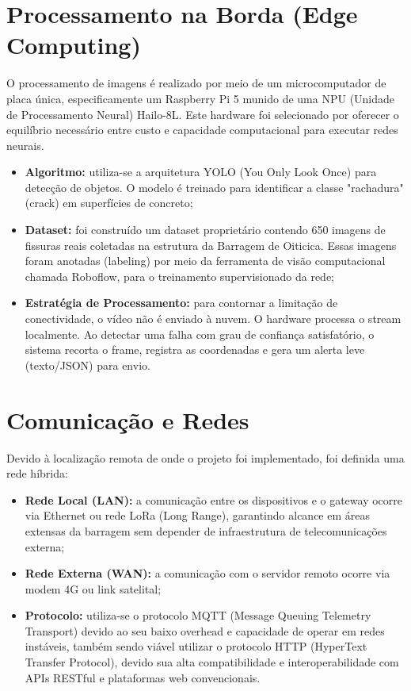 \section{Processamento na Borda (Edge Computing)}
O processamento de imagens é realizado por meio de um microcomputador de placa única, especificamente um Raspberry Pi 5 munido de uma NPU (Unidade de Processamento Neural) Hailo-8L. Este hardware foi selecionado por oferecer o equilíbrio necessário entre custo e capacidade computacional para executar redes neurais.
\begin{itemize}
    \item \textbf{Algoritmo:} utiliza-se a arquitetura YOLO (You Only Look Once) para detecção de objetos. O modelo é treinado para identificar a classe "rachadura" (crack) em superfícies de concreto;
    \item \textbf{Dataset:} foi construído um dataset proprietário contendo 650 imagens de fissuras reais coletadas na estrutura da Barragem de Oiticica. Essas imagens foram anotadas (labeling) por meio da ferramenta de visão computacional chamada Roboflow, para o treinamento supervisionado da rede;
    \item \textbf{Estratégia de Processamento:} para contornar a limitação de conectividade, o vídeo não é enviado à nuvem. O hardware processa o stream localmente. Ao detectar uma falha com grau de confiança satisfatório, o sistema recorta o frame, registra as coordenadas e gera um alerta leve (texto/JSON) para envio.
\end{itemize}

\section{Comunicação e Redes}
Devido à localização remota de onde o projeto foi implementado, foi definida uma rede híbrida:
\begin{itemize}
    \item \textbf{Rede Local (LAN):} a comunicação entre os dispositivos e o gateway ocorre via Ethernet ou rede LoRa (Long Range), garantindo alcance em áreas extensas da barragem sem depender de infraestrutura de telecomunicações externa;
    \item \textbf{Rede Externa (WAN):} a comunicação com o servidor remoto ocorre via modem 4G ou link satelital;
    \item \textbf{Protocolo:} utiliza-se o protocolo MQTT (Message Queuing Telemetry Transport) devido ao seu baixo overhead e capacidade de operar em redes instáveis, também sendo viável utilizar o protocolo HTTP (HyperText Transfer Protocol), devido sua alta compatibilidade e interoperabilidade com APIs RESTful e plataformas web convencionais.
\end{itemize}

